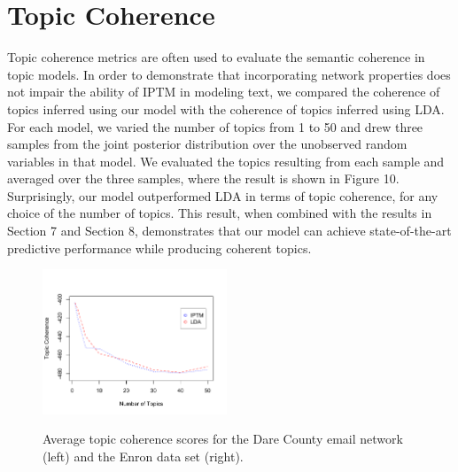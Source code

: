 \documentclass[a4paper]{article}
\begin{document}
   \section{Topic Coherence} \label{sec:topiccoherence}
   Topic coherence metrics \cite{mimno2011optimizing} are often used to evaluate the semantic coherence in topic models. In order to demonstrate that incorporating network properties does not impair the ability of IPTM in modeling text, we compared the coherence of topics inferred using our model with the coherence of topics inferred using LDA. For each model, we varied the number of topics from 1 to 50 and drew three samples from the joint posterior distribution over the unobserved random variables in that model. We evaluated the topics resulting from each sample and averaged over the three samples, where the result is shown in Figure 10. Surprisingly, our model outperformed LDA in terms of topic coherence, for any choice of the number of topics. This result, when combined with the results in Section 7 and Section 8, demonstrates that our model can achieve state-of-the-art predictive performance while producing coherent topics.
               \begin{figure}[ht]
               	\centering
               	\includegraphics[width=0.49\textwidth]{plots/topiccoherenceplot.pdf}  
               	\label{fig:Daretopic}
               	 \caption{Average topic coherence scores for the Dare County email network (left) and the Enron data set (right).}
               \end{figure}
\end{document}
